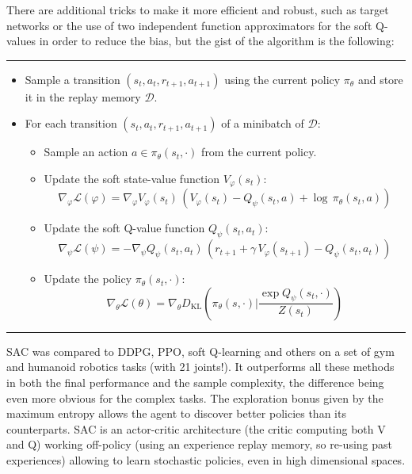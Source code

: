 \documentclass[
  letterpaper,
  DIV=11,
  numbers=noendperiod]{scrreprt}
\providecommand{\tightlist}{%
  \setlength{\itemsep}{0pt}\setlength{\parskip}{0pt}}\usepackage{longtable,booktabs,array}
\begin{document}
There are additional tricks to make it more efficient and robust, such
as target networks or the use of two independent function approximators
for the soft Q-values in order to reduce the bias, but the gist of the
algorithm is the following:

\begin{center}\rule{0.5\linewidth}{0.5pt}\end{center}

\begin{itemize}
\tightlist
\item
  Sample a transition \((s_t, a_t, r_{t+1}, a_{t+1})\) using the current
  policy \(\pi_\theta\) and store it in the replay memory
  \(\mathcal{D}\).
\item
  For each transition \((s_t, a_t, r_{t+1}, a_{t+1})\) of a minibatch of
  \(\mathcal{D}\):

  \begin{itemize}
  \tightlist
  \item
    Sample an action \(a \in \pi_\theta(s_t, \cdot)\) from the current
    policy.
  \item
    Update the soft state-value function \(V_\varphi(s_t)\): \[
      \nabla_\varphi \mathcal{L}(\varphi) = \nabla_\varphi V_\varphi(s_t) \, (V_\varphi(s_t) - Q_\psi(s_{t}, a) + \log \, \pi_\theta(s_t, a) )
      \]
  \item
    Update the soft Q-value function \(Q_\psi(s_t, a_t)\): \[
      \nabla_\psi \mathcal{L}(\psi) = - \nabla_\psi Q_\psi(s_t, a_t) \, (r_{t+1} + \gamma \, V_\varphi(s_{t+1}) - Q_\psi(s_t, a_t))
      \]
  \item
    Update the policy \(\pi_\theta(s_t, \cdot)\): \[
      \nabla_\theta \mathcal{L}(\theta) = \nabla_\theta D_\text{KL}(\pi_\theta(s, \cdot) | \frac{\exp Q_\psi(s_t, \cdot)}{Z(s_t)})
      \]
  \end{itemize}
\end{itemize}

\begin{center}\rule{0.5\linewidth}{0.5pt}\end{center}

SAC was compared to DDPG, PPO, soft Q-learning and others on a set of
gym and humanoid robotics tasks (with 21 joints!). It outperforms all
these methods in both the final performance and the sample complexity,
the difference being even more obvious for the complex tasks. The
exploration bonus given by the maximum entropy allows the agent to
discover better policies than its counterparts. SAC is an actor-critic
architecture (the critic computing both V and Q) working off-policy
(using an experience replay memory, so re-using past experiences)
allowing to learn stochastic policies, even in high dimensional spaces.
\end{document}
